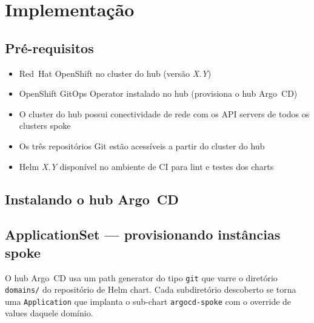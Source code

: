 \documentclass[11pt,a4paper]{article}
\begin{document}
\section{Implementação}
\label{sec:implementation}

\subsection{Pré-requisitos}

\begin{itemize}[leftmargin=1.5em]
  \item Red~Hat OpenShift no cluster do hub (versão \textit{X.Y})
  \item OpenShift GitOps Operator instalado no hub (provisiona o hub Argo~CD)
  \item O cluster do hub possui conectividade de rede com os API servers de todos os
        clusters spoke
  \item Os três repositórios Git estão acessíveis a partir do cluster do hub
  \item Helm \textit{X.Y} disponível no ambiente de CI para lint e testes dos charts
\end{itemize}

\subsection{Instalando o hub Argo~CD}


\subsection{ApplicationSet --- provisionando instâncias spoke}

O hub Argo~CD usa um path generator do tipo \texttt{git} que varre o diretório
\texttt{domains/} do repositório de Helm chart.
Cada subdiretório descoberto se torna uma \texttt{Application} que implanta o sub-chart
\texttt{argocd-spoke} com o override de values daquele domínio.
\end{document}
